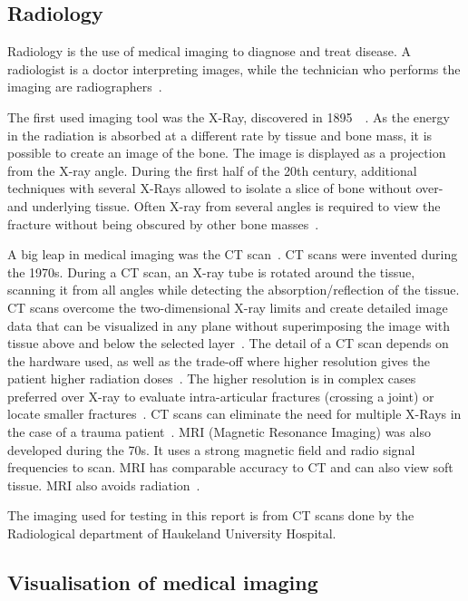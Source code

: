 \documentclass[a4paper]{report}
\begin{document}
\subsection{Radiology}
Radiology is the use of medical imaging to diagnose and treat disease. A radiologist is a doctor interpreting images, while the technician who performs the imaging are radiographers~\cite{swiontkowski_manual_2013}.

The first used imaging tool was the X-Ray, discovered in 1895~\cite{hamblen_outline_2010}~\cite{suetens_fundamentals_2017}. As the energy in the radiation is absorbed at a different rate by tissue and bone mass, it is possible to create an image of the bone. The image is displayed as a projection from the X-ray angle. During the first half of the 20th century, additional techniques with several X-Rays allowed to isolate a slice of bone without over- and underlying tissue. Often X-ray from several angles is required to view the fracture without being obscured by other bone masses~\cite{ebnezar_textbook_2016}.

A big leap in medical imaging was the CT scan~\cite{bradley_history_2008}.
CT scans were invented during the 1970s. During a CT scan, an X-ray tube is rotated around the tissue, scanning it from all angles while detecting the absorption/reflection of the tissue. CT scans overcome the two-dimensional X-ray limits and create detailed image data that can be visualized in any plane without superimposing the image with tissue above and below the selected layer~\cite{hamblen_outline_2010}. The detail of a CT scan depends on the hardware used, as well as the trade-off where higher resolution gives the patient higher radiation doses~\cite{bradley_history_2008}. The higher resolution is in complex cases preferred over X-ray to evaluate intra-articular fractures (crossing a joint) or locate smaller fractures~\cite{ebnezar_textbook_2016}.
CT scans can eliminate the need for multiple X-Rays in the case of a trauma patient~\cite{swiontkowski_manual_2013}.
MRI (Magnetic Resonance Imaging) was also developed during the 70s. It uses a strong magnetic field and radio signal frequencies to scan. MRI has comparable accuracy to CT and can also view soft tissue. MRI also avoids radiation~\cite{swiontkowski_manual_2013}.


The imaging used for testing in this report is from CT scans done by the Radiological department of Haukeland University Hospital.

\subsection{Visualisation of medical imaging}
\end{document}
